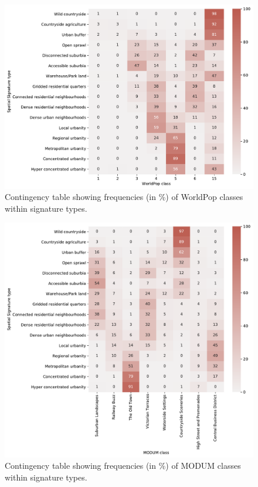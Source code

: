 \documentclass[fleqn,10pt]{wlscirep}
\providecommand{\DIFaddendFL}{} %
\begin{document}
\begin{figure}[ht]
    \centering
    \DIFaddendFL \includegraphics[width=.8\linewidth]{fig/crosstab_worldpop.pdf}
    \caption{Contingency table showing frequencies (in \%) of WorldPop classes within signature types.}
    \label{fig:crosstab_worldpop}
\end{figure}

\begin{figure}[ht]
    \centering
    \includegraphics[width=.8\linewidth]{fig/crosstab_modum.pdf}
    \caption{Contingency table showing frequencies (in \%) of MODUM classes within signature types.}
    \label{fig:crosstab_modum}
\end{figure}
\end{document}
